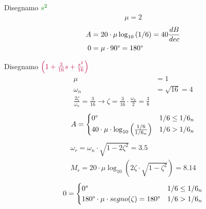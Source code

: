 \documentclass[a4paper]{article}
\begin{document}
\begin{example}
    \vspace{1em}
    \noindent
    Disegnamo \( \color{green!50!black} s^2 \)
    \[
    \begin{aligned}
      \mu = 2
    \end{aligned}
    \] 
    \[
    \begin{aligned}
      A &= 20 \cdot \mu \log_{10} \left( 1/6  \right) = 40 \frac{dB}{dec}\\
      0 &= \mu \cdot 90\degree = 180\degree
    \end{aligned}
    \] 
    \label{12-12-D3}

    \vspace{1em}
    \noindent
    Disegnamo \( \color{purple} \left( 1 + \frac{3}{16}s + \frac{s ^2}{16} \right)  \) 
    \[
    \begin{aligned}
      \mu &= 1\\
      \omega_n &= \sqrt{16} = 4\\
      \frac{2 \zeta}{\omega_n} = \frac{3}{16} \to \zeta = \frac{3}{16} \cdot \frac{\omega_n}{2} = \frac{3}{8}
    \end{aligned}
    \] 
    \[
    \begin{aligned}
      A &= \begin{cases}
        0\degree & 1/6 \le 1/6_n\\
        40 \cdot \mu \cdot \log_{10} \left( \frac{1/6}{1/6_n} \right) & 1/6 > 1/6_n
      \end{cases}\\
    \end{aligned}
    \] 
    \[
      \begin{aligned}
        \omega_r = \omega_n \cdot \sqrt{1 - 2 \zeta^2} = 3.5\\
        M_r = 20 \cdot \mu \log_{10} \left( 2 \zeta \cdot \sqrt{1 - \zeta^2} \right) = 8.14
      \end{aligned}
    \] 
    \[
    0 = \begin{cases}
      0\degree & 1/6 \le 1/6_n\\
      180\degree \cdot \mu \cdot segno(\zeta) = 180\degree & 1/6 > 1/6_n
    \end{cases}
    \] 
    \label{12-12-D4}


\end{example}
\end{document}
